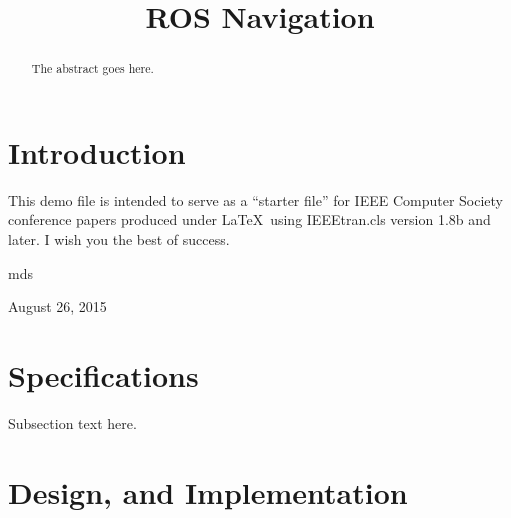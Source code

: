 \documentclass[conference,compsoc]{IEEEtran}
\begin{document}
\title{ROS Navigation}





\author{
\and
{}
\and
{}
}

\maketitle

\begin{abstract}
The abstract goes here.
\end{abstract}

\IEEEpeerreviewmaketitle



\section{Introduction}
This demo file is intended to serve as a ``starter file''
for IEEE Computer Society conference papers produced under \LaTeX\ using
IEEEtran.cls version 1.8b and later.
I wish you the best of success.

\hfill mds
 
\hfill August 26, 2015

\section{Specifications}
Subsection text here.

\section{Design, and Implementation}
\end{document}
